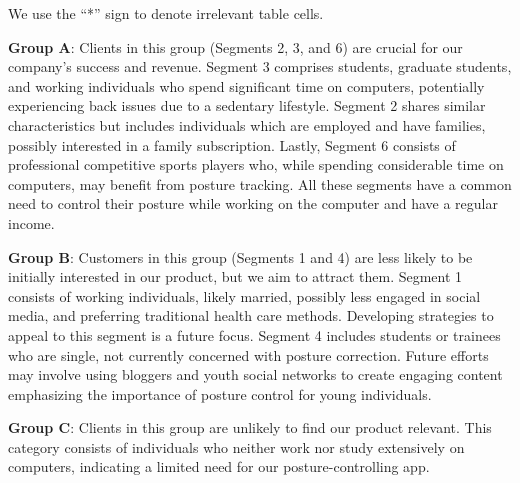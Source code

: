 We use the “*” sign to denote irrelevant table cells.

\textbf{Group A}: Clients in this group (Segments 2, 3, and 6) are crucial for our company's success and revenue. Segment 3 comprises students, graduate students, and working individuals who spend significant time on computers, potentially experiencing back issues due to a sedentary lifestyle. Segment 2 shares similar characteristics but includes individuals which are employed and have families, possibly interested in a family subscription. Lastly, Segment 6 consists of professional competitive sports players who, while spending considerable time on computers, may benefit from posture tracking. All these segments have a common need to control their posture while working on the computer and have a regular income.

\textbf{Group B}: Customers in this group (Segments 1 and 4) are less likely to be initially interested in our product, but we aim to attract them. Segment 1 consists of working individuals, likely married, possibly less engaged in social media, and preferring traditional health care methods. Developing strategies to appeal to this segment is a future focus. Segment 4 includes students or trainees who are single, not currently concerned with posture correction. Future efforts may involve using bloggers and youth social networks to create engaging content emphasizing the importance of posture control for young individuals.

\textbf{Group C}: Clients in this group are unlikely to find our product relevant. This category consists of individuals who neither work nor study extensively on computers, indicating a limited need for our posture-controlling app.





